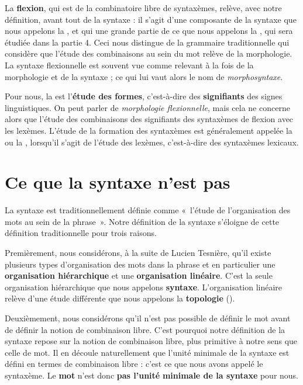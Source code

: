 La \textbf{flexion}, qui est de la combinatoire libre de syntaxèmes, relève, avec notre définition, avant tout de la syntaxe : il s’agit d’une composante de la syntaxe que nous appelons la , et qui une grande partie de ce que nous appelons la , qui sera étudiée dans la partie 4. Ceci nous distingue de la grammaire traditionnelle qui considère que l’étude des combinaisons au sein du mot relève de la morphologie. La syntaxe flexionnelle est souvent vue comme relevant à la fois de la morphologie et de la syntaxe ; ce qui lui vaut alors le nom de \textit{morphosyntaxe}.

Pour nous, la  est l’\textbf{étude des formes}, c’est-à-dire des \textbf{signifiants} des signes linguistiques. On peut parler de \textit{morphologie flexionnelle}, mais cela ne concerne alors que l’étude des combinaisons des signifiants des syntaxèmes de flexion avec les lexèmes. L’étude de la formation des syntaxèmes est généralement appelée la  ou la , lorsqu’il s’agit de l’étude des lexèmes, c’est-à-dire des syntaxèmes lexicaux.

\section{Ce que la syntaxe n’est pas}\label{sec:3.1.7}

La syntaxe est traditionnellement définie comme «~l’étude de l’organisation des mots au sein de la phrase~». Notre définition de la syntaxe s’éloigne de cette définition traditionnelle pour trois raisons.

Premièrement, nous considérons, à la suite de Lucien Tesnière, qu’il existe plusieurs types d’organisation des mots dans la phrase et en particulier une \textbf{organisation hiérarchique} et une \textbf{organisation linéaire}. C’est la seule organisation hiérarchique que nous appelons \textbf{syntaxe}. L’organisation linéaire relève d’une étude différente que nous appelons la \textbf{topologie} ().

Deuxièmement, nous considérons qu’il n’est pas possible de définir le mot avant de définir la notion de combinaison libre. C’est pourquoi notre définition de la syntaxe repose sur la notion de combinaison libre, plus primitive à notre sens que celle de mot. Il en découle naturellement que l’unité minimale de la syntaxe est défini en termes de combinaison libre : c’est ce que nous avons appelé le syntaxème. Le \textbf{mot} n’est donc \textbf{pas l’unité} \textbf{minimale de la syntaxe} pour nous.

